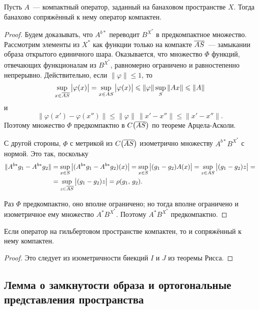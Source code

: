 \documentclass{notes}
\begin{document}
	\begin{thm}
		Пусть $A$~--- компактный оператор, заданный на банаховом пространстве $X$. Тогда банахово сопряжённый к нему оператор компактен.
		\begin{proof}
			Будем доказывать, что $A^{b*}$ переводит $B^{X^*}$ в предкомпактное множество. Рассмотрим элементы из $X^*$ как функции только на компакте $\overline{AS}$~--- замыкании образа открытого единичного шара. Оказывается, что множество $\Phi$ функций, отвечающих функционалам из $B^{X^*}$, равномерно ограничено и равностепенно непрерывно. Действительно, если $\|\varphi\| \leqslant 1$, то
			\[
				\sup\limits_{x \in \overline{AS}} \big|\varphi(x)\big| = \sup\limits_{x \in AS} \big|\varphi(x)\big| \leqslant \|\varphi\| \sup\limits_{S} \|Ax\| \leqslant \|A\|
			\]
			и
			\[
				\big\|\varphi(x') - \varphi(x'')\big\| \leqslant \|\varphi\| \, \|x' - x''\| \leqslant \|x' - x''\|.
			\]
			Поэтому множество $\Phi$ предкомпактно в $C\big(\overline{AS}\big)$ по теореме Арцела-Асколи. 

			С другой стороны, $\Phi$ с метрикой из $C\big(\overline{AS}\big)$ изометрично множеству $A^{b*} B^{X^*}$ с нормой. Это так, поскольку
			\begin{align*}
				\|A^{b*} g_1 - A^{b*} g_2 \| &= \sup\limits_{x\in S} \big|(A^{b*} g_1 - A^{b*}g_2)(x)\big| = \sup\limits_{x\in S}  \big|(g_1 - g_2)A(x)\big| = \sup\limits_{z\in AS}  \big|(g_1 - g_2)z\big| = \\
				&= \sup\limits_{z\in \overline{AS}}  \big|(g_1 - g_2)z\big| = \rho(g_1, \, g_2).
			\end{align*}

			Раз $\Phi$ предкомпактно, оно вполне ограничено; но тогда вполне ограничено и изометричное ему множество $A^* B^{X^*}$. Поэтому $A^* B^{X^*}$ предкомпактно.
		\end{proof}
	\end{thm}

	\begin{cor}
		Если оператор на гильбертовом пространстве компактен, то и сопряжённый к нему компактен.
		\begin{proof}
			Это следует из изометричности биекций $I$ и $J$ из теоремы Рисса.
		\end{proof}
	\end{cor}

\subsection{Лемма о замкнутости образа и ортогональные представления пространства}
\end{document}
